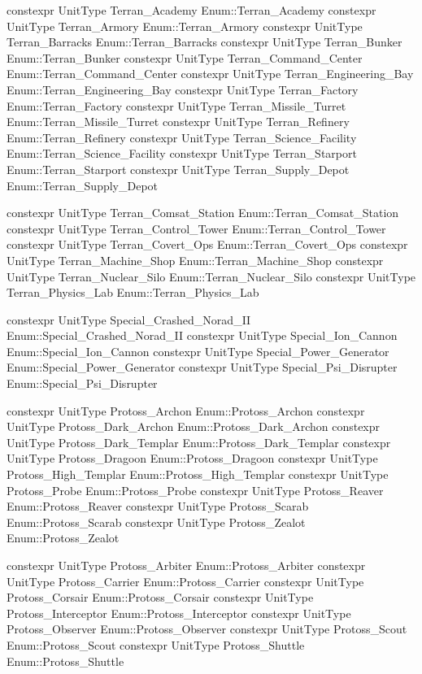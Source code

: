 \begin{codebox}[变量(人族建筑)]
constexpr UnitType Terran_Academy {Enum::Terran_Academy}
constexpr UnitType Terran_Armory {Enum::Terran_Armory}
constexpr UnitType Terran_Barracks {Enum::Terran_Barracks}
constexpr UnitType Terran_Bunker {Enum::Terran_Bunker}
constexpr UnitType Terran_Command_Center {Enum::Terran_Command_Center}
constexpr UnitType Terran_Engineering_Bay {Enum::Terran_Engineering_Bay}
constexpr UnitType Terran_Factory {Enum::Terran_Factory}
constexpr UnitType Terran_Missile_Turret {Enum::Terran_Missile_Turret}
constexpr UnitType Terran_Refinery {Enum::Terran_Refinery}
constexpr UnitType Terran_Science_Facility {Enum::Terran_Science_Facility}
constexpr UnitType Terran_Starport {Enum::Terran_Starport}
constexpr UnitType Terran_Supply_Depot {Enum::Terran_Supply_Depot}
\end{codebox}
\begin{codebox}[变量(人族附加建筑)]
constexpr UnitType Terran_Comsat_Station {Enum::Terran_Comsat_Station}
constexpr UnitType Terran_Control_Tower {Enum::Terran_Control_Tower}
constexpr UnitType Terran_Covert_Ops {Enum::Terran_Covert_Ops}
constexpr UnitType Terran_Machine_Shop {Enum::Terran_Machine_Shop}
constexpr UnitType Terran_Nuclear_Silo {Enum::Terran_Nuclear_Silo}
constexpr UnitType Terran_Physics_Lab {Enum::Terran_Physics_Lab}
\end{codebox}
\begin{codebox}[变量(人族特殊建筑)]
constexpr UnitType Special_Crashed_Norad_II {Enum::Special_Crashed_Norad_II}
constexpr UnitType Special_Ion_Cannon {Enum::Special_Ion_Cannon}
constexpr UnitType Special_Power_Generator {Enum::Special_Power_Generator}
constexpr UnitType Special_Psi_Disrupter {Enum::Special_Psi_Disrupter}
\end{codebox}
\begin{codebox}[变量(神族地面单位)]
constexpr UnitType Protoss_Archon {Enum::Protoss_Archon}
constexpr UnitType Protoss_Dark_Archon {Enum::Protoss_Dark_Archon}
constexpr UnitType Protoss_Dark_Templar {Enum::Protoss_Dark_Templar}
constexpr UnitType Protoss_Dragoon {Enum::Protoss_Dragoon}
constexpr UnitType Protoss_High_Templar {Enum::Protoss_High_Templar}
constexpr UnitType Protoss_Probe {Enum::Protoss_Probe}
constexpr UnitType Protoss_Reaver {Enum::Protoss_Reaver}
constexpr UnitType Protoss_Scarab {Enum::Protoss_Scarab}
constexpr UnitType Protoss_Zealot {Enum::Protoss_Zealot}
\end{codebox}
\begin{codebox}[变量(神族空中单位)]
constexpr UnitType Protoss_Arbiter {Enum::Protoss_Arbiter}
constexpr UnitType Protoss_Carrier {Enum::Protoss_Carrier}
constexpr UnitType Protoss_Corsair {Enum::Protoss_Corsair}
constexpr UnitType Protoss_Interceptor {Enum::Protoss_Interceptor}
constexpr UnitType Protoss_Observer {Enum::Protoss_Observer}
constexpr UnitType Protoss_Scout {Enum::Protoss_Scout}
constexpr UnitType Protoss_Shuttle {Enum::Protoss_Shuttle}
\end{codebox}
